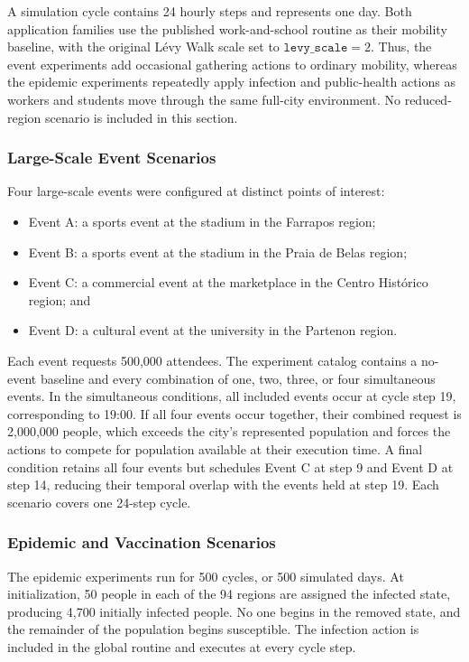 A simulation cycle contains 24 hourly steps and represents one day. Both application families use the published work-and-school routine as their mobility baseline, with the original L\'evy Walk scale set to $\texttt{levy\_scale}=2$. Thus, the event experiments add occasional gathering actions to ordinary mobility, whereas the epidemic experiments repeatedly apply infection and public-health actions as workers and students move through the same full-city environment. No reduced-region scenario is included in this section.

\subsubsection{Large-Scale Event Scenarios}

Four large-scale events were configured at distinct points of interest:

\begin{itemize}
    \item Event A: a sports event at the stadium in the Farrapos region;
    \item Event B: a sports event at the stadium in the Praia de Belas region;
    \item Event C: a commercial event at the marketplace in the Centro Hist\'orico region; and
    \item Event D: a cultural event at the university in the Partenon region.
\end{itemize}

Each event requests 500,000 attendees. The experiment catalog contains a no-event baseline and every combination of one, two, three, or four simultaneous events. In the simultaneous conditions, all included events occur at cycle step 19, corresponding to 19:00. If all four events occur together, their combined request is 2,000,000 people, which exceeds the city's represented population and forces the actions to compete for population available at their execution time. A final condition retains all four events but schedules Event C at step 9 and Event D at step 14, reducing their temporal overlap with the events held at step 19. Each scenario covers one 24-step cycle.

\subsubsection{Epidemic and Vaccination Scenarios}

The epidemic experiments run for 500 cycles, or 500 simulated days. At initialization, 50 people in each of the 94 regions are assigned the infected state, producing 4,700 initially infected people. No one begins in the removed state, and the remainder of the population begins susceptible. The infection action is included in the global routine and executes at every cycle step.

